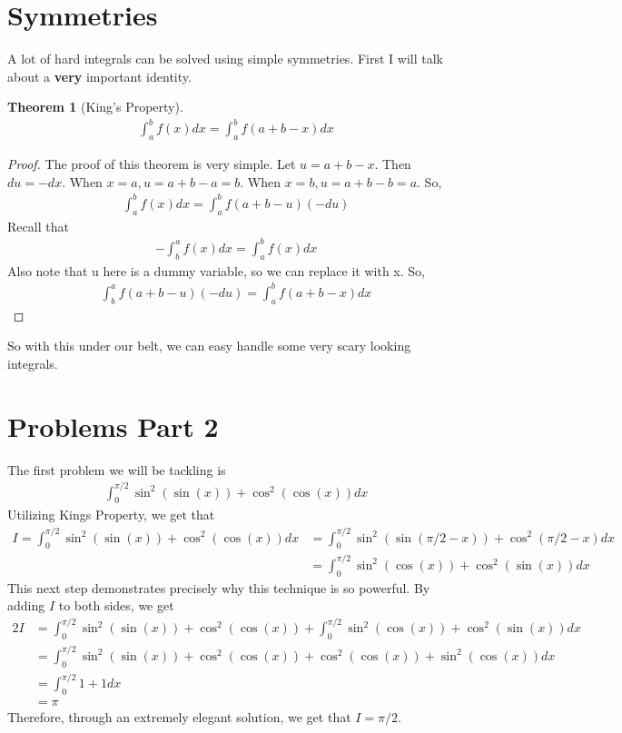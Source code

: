 \documentclass[12pt]{article}
\newtheorem{theorem}{Theorem}[section]
\theoremstyle{definition}
\theoremstyle{remark}
\begin{document}
    \section{Symmetries}
    A lot of hard integrals can be solved using simple symmetries. 
    First I will talk about a \textbf{very} important identity.

    \begin{theorem}[King's Property]
        \begin{align*}
            \int_{a}^{b} f(x)dx = \int_{a}^{b} f(a+b-x)dx
        \end{align*}
    \end{theorem}

    \begin{proof}
        The proof of this theorem is very simple.
        Let $u = a + b - x$. Then $du = -dx$.
        When $x = a, u = a + b - a = b$.
        When $x = b, u = a + b - b = a$. So,
        \begin{align*}
            \int_{a}^{b} f(x)dx = \int_{a}^{b} f(a+b-u)(-du)
        \end{align*}
        Recall that 
        \begin{align*}
        -\int_{b}^{a} f(x)dx = \int_{a}^{b} f(x)dx     
        \end{align*}
        Also note that u here is a dummy variable, so we can replace it with x.
        So,
        \begin{align*}
            \int_{b}^{a}f(a+b-u)(-du) = \int_{a}^{b} f(a+b-x)dx
        \end{align*}
    \end{proof}
    So with this under our belt, we can easy handle some very scary looking integrals.

    \section{Problems Part 2}
    The first problem we will be tackling is 
    \begin{align*}
        \int_{0}^{\pi/2} \sin^2(\sin(x)) + \cos^2(\cos(x))dx
    \end{align*}
    Utilizing Kings Property, we get that 
    \begin{align*}
        I = \int_{0}^{\pi/2} \sin^2(\sin(x))+\cos^2(\cos(x))dx &= \int_{0}^{\pi/2} \sin^2(\sin(\pi/2 - x)) + \cos^2(\pi/2 - x)dx \\ 
        &= \int_{0}^{\pi/2} \sin^2(\cos(x)) + \cos^2(\sin(x))dx
    \end{align*}
    This next step demonstrates precisely why this technique is so powerful.
    By adding $I$ to both sides, we get 
    \begin{align*}
        2I &= \int_{0}^{\pi/2} \sin^2(\sin(x)) + \cos^2(\cos(x)) + \int_{0}^{\pi/2} \sin^2(\cos(x)) + \cos^2(\sin(x))dx \\ 
        &= \int_{0}^{\pi/2} \sin^2(\sin(x)) + \cos^2(\cos(x)) + \cos^2(\cos(x)) + \sin^2(\cos(x))dx \\ 
        &= \int_{0}^{\pi/2} 1 + 1dx \\ 
        &= \pi
    \end{align*}
    Therefore, through an extremely elegant solution, we get that $I = \pi/2$.
\end{document}
